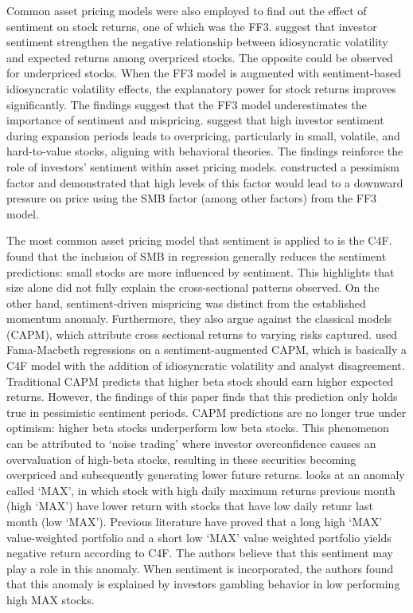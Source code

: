 Common asset pricing models were also employed to find out the effect of sentiment on stock returns, one of which was the FF3.  suggest that investor sentiment strengthen the negative relationship between idiosyncratic volatility and expected returns among overpriced stocks. The opposite could be observed for underpriced stocks. When the FF3 model is augmented with sentiment-based idiosyncratic volatility effects, the explanatory power for stock returns improves significantly. The findings suggest that the FF3 model underestimates the importance of sentiment and mispricing.  suggest that high investor sentiment during expansion periods leads to overpricing, particularly in small, volatile, and hard-to-value stocks, aligning with behavioral theories. The findings reinforce the role of investors' sentiment within asset pricing models.  constructed a pessimism factor and demonstrated that high levels of this factor would lead to a downward pressure on price using the SMB factor (among other factors) from the FF3 model. 


The most common asset pricing model that sentiment is applied to is the C4F.  found that the inclusion of SMB in regression generally reduces the sentiment predictions: small stocks are more influenced by sentiment. This highlights that size alone did not fully explain the cross-sectional patterns observed. On the other hand, sentiment-driven mispricing was distinct from the established momentum anomaly. Furthermore, they also argue against the classical models (CAPM), which attribute cross sectional returns to varying risks captured.  used Fama-Macbeth regressions on a sentiment-augmented CAPM, which is basically a C4F model with the addition of idiosyncratic volatility and analyst disagreement. Traditional CAPM predicts that higher beta stock should earn higher expected returns. However, the findings of this paper finds that this prediction only holds true in pessimistic sentiment periods. CAPM predictions are no longer true under optimism: higher beta stocks underperform low beta stocks. This phenomenon can be attributed to `noise trading' where investor overconfidence causes an overvaluation of high-beta stocks, resulting in these securities becoming overpriced and subsequently generating lower future returns.  looks at an anomaly called `MAX', in which stock with high daily maximum returns previous month (high `MAX') have lower return with stocks that have low daily retunr last month (low `MAX'). Previous literature have proved that a long high `MAX' value-weighted portfolio and a short low `MAX' value weighted portfolio yields negative return according to C4F. The authors believe that this sentiment may play a role in this anomaly. When sentiment is incorporated, the authors found that this anomaly is explained by investors gambling behavior in low performing high MAX stocks.



